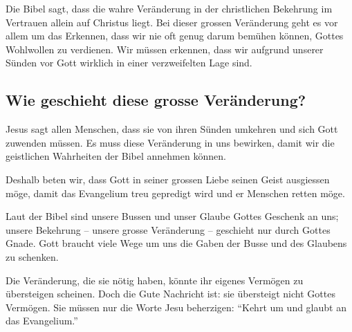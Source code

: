 \documentclass{../../inc/mybib}
\begin{document}
Die Bibel sagt, dass die wahre Veränderung in der christlichen Bekehrung im Vertrauen allein auf Christus liegt. Bei dieser grossen Veränderung geht es vor allem um das Erkennen, dass wir nie oft genug darum bemühen können, Gottes Wohlwollen zu verdienen. Wir müssen erkennen, dass wir aufgrund unserer Sünden vor Gott wirklich in einer verzweifelten Lage sind.
\subsection{Wie geschieht diese grosse Veränderung?}
Jesus sagt allen Menschen, dass sie von ihren Sünden umkehren und sich Gott zuwenden müssen. Es muss diese Veränderung in uns bewirken, damit wir die geistlichen Wahrheiten der Bibel annehmen können.

Deshalb beten wir, dass Gott in seiner grossen Liebe seinen Geist ausgiessen möge, damit das Evangelium treu gepredigt wird und er Menschen retten möge.

Laut der Bibel sind unsere Bussen und unser Glaube Gottes Geschenk an uns; unsere Bekehrung -- unsere grosse Veränderung -- geschieht nur durch Gottes Gnade. Gott braucht viele Wege um uns die Gaben der Busse und des Glaubens zu schenken.

Die Veränderung, die sie nötig haben, könnte ihr eigenes Vermögen zu übersteigen scheinen. Doch die Gute Nachricht ist: sie übersteigt nicht Gottes Vermögen. Sie müssen nur die Worte Jesu beherzigen: \enquote{Kehrt um und glaubt an das Evangelium.}
\end{document}
